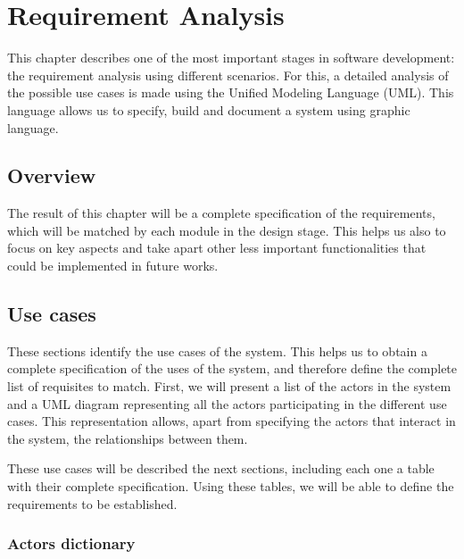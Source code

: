 \chapter{Requirement Analysis}
\label{chap:requirements}

\begin{chapterintro}
This chapter describes one of the most important stages in software development: the requirement analysis using different scenarios. For this, a detailed analysis of the possible use cases is made using the Unified Modeling Language (UML). This language allows us to specify, build and document a system using graphic language. 
\end{chapterintro}


\cleardoublepage

\section{Overview}
The result of this chapter will be a complete specification of the requirements, which will be matched by each module in the design stage. This helps us also to focus on key aspects and take apart other less important functionalities that could be implemented in future works.


\section{Use cases}

These sections identify the use cases of the system. This helps us to obtain a complete specification of the uses of the system, and therefore define the complete list of requisites to match.  First, we will present a list of the actors in the system and a UML diagram representing all the actors participating in the different use cases. This representation allows, apart from specifying the actors that interact in the system, the relationships between them.

These use cases will be described the next sections, including each one a table with their complete specification. Using these tables, we will be able to define the requirements to be established.


\subsection{Actors dictionary}

